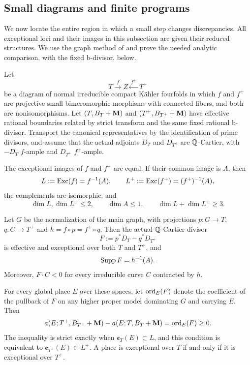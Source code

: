 \subsection{Small diagrams and finite programs}

We now locate the entire region in which a small step changes
discrepancies.  All exceptional loci and their images in this
subsection are given their reduced structures.  We use the graph method
of \cite[Lemma~2.1]{ProjectiveLCFourfolds} and prove the needed analytic
comparison, with the fixed b-divisor, below.

\begin{lemma}
\label{lem:small-comparison}
Let
\[
 T\xrightarrow{\ f\ }Z\xleftarrow{\ f^+\ }T^+
\]
be a diagram of normal irreducible compact K\"ahler fourfolds in which
$f$ and $f^+$ are projective small bimeromorphic morphisms with
connected fibers, and both are nonisomorphisms.  Let $(T,B_T+\mathbf{M})$ and
$(T^+,B_{T^+}+\mathbf{M})$ have effective rational boundaries related by
strict transform and the same fixed rational b-divisor.  Transport the
canonical representatives by the identification of prime divisors,
and assume that the actual adjoints $D_T$ and $D_{T^+}$ are
$\mathbb{Q}$-Cartier, with $-D_T$ $f$-ample and $D_{T^+}$ $f^+$-ample.

The exceptional images of $f$ and $f^+$ are equal.  If their common
image is $A$, then
\begin{equation}\label{eq:small-loci}
 L:=\operatorname{Exc}(f)=f^{-1}(A),\qquad
 L^+:=\operatorname{Exc}(f^+)=(f^+)^{-1}(A),
\end{equation}
the complements are isomorphic, and
\begin{equation}\label{eq:small-dimensions}
 \dim L,\dim L^+\leq2,\qquad \dim A\leq1,
 \qquad \dim L+\dim L^+\geq3.
\end{equation}

Let $G$ be the normalization of the main graph, with projections
$p:G\to T$, $q:G\to T^+$ and $h=f\circ p=f^+\circ q$.  Then the
actual $\mathbb{Q}$-Cartier divisor
\begin{equation}\label{eq:small-divisor}
 F:=p^*D_T-q^*D_{T^+}
\end{equation}
is effective and exceptional over both $T$ and $T^+$, and
\begin{equation}\label{eq:small-support}
 \operatorname{Supp} F=h^{-1}(A).
\end{equation}
Moreover, $F\cdot C<0$ for every irreducible curve $C$ contracted by $h$.

For every global place $E$ over these spaces, let $\operatorname{ord}_E(F)$ denote
the coefficient of the pullback of $F$ on any higher proper model
dominating $G$ and carrying $E$.  Then
\begin{equation}\label{eq:small-discrepancies}
 a(E;T^+,B_{T^+}+\mathbf{M})-a(E;T,B_T+\mathbf{M})=\operatorname{ord}_E(F)\geq0.
\end{equation}
The inequality is strict exactly when $\cent_T(E)\subset L$, and this
condition is equivalent to $\cent_{T^+}(E)\subset L^+$.  A place is
exceptional over $T$ if and only if it is exceptional over $T^+$.
\end{lemma}


